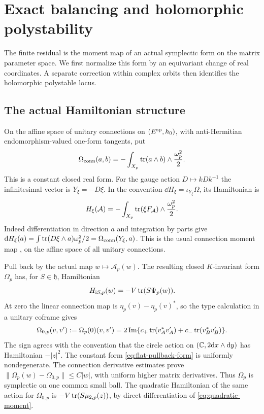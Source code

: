 \section{Exact balancing and holomorphic polystability}
\label{sec:balancing}

The finite residual is the moment map of an actual symplectic
form on the matrix parameter space. We first normalize this form
by an equivariant change of real coordinates. A separate
correction within complex orbits then identifies the holomorphic
polystable locus.

\subsection{The actual Hamiltonian structure}

On the affine space of unitary connections on $(E^{\rm sp},h_0)$,
with anti-Hermitian endomorphism-valued one-form tangents, put
\begin{equation}\label{eq:connection-symplectic}
 \Omega_{\rm conn}(a,b)
       =-\int_{X_p}\operatorname{tr}(a\wedge b)\wedge\frac{\omega_p^2}{2}.
\end{equation}
This is a constant closed real form. For the gauge action
$D\mapsto kDk^{-1}$ the infinitesimal vector is
$Y_\xi=-D\xi$. In the convention $\dd H_\xi=\iota_{Y_\xi}\Omega$,
its Hamiltonian is
\[
 H_\xi(\mathcal A)
       =-\int_{X_p}\operatorname{tr}(\xi F_{\mathcal A})\wedge\frac{\omega_p^2}{2}.
\]
Indeed differentiation in direction $a$ and integration by
parts give
$\mathrm d H_\xi(a)=\int\operatorname{tr}(D\xi\wedge a)\omega_p^2/2
=\Omega_{\rm conn}(Y_\xi,a)$.
This is the usual connection moment map
\cite[Section 1.1 and Lemma 1.5]{ACG}, on the affine space
of all unitary connections.

Pull back by the actual map $w\mapsto\mathcal A_p(w)$.
The resulting closed $K$-invariant form $\Omega_p$ has,
for $S\in\mathfrak h$, Hamiltonian
\begin{equation}\label{eq:actual-paired-hamiltonian}
       H_{\mathrm iS,p}(w)=-V\operatorname{tr}(S\Psi_p(w)).
\end{equation}
At zero the linear connection map is
$\eta_p(v)-\eta_p(v)^*$, so the type calculation in a
unitary coframe gives
\begin{equation}\label{eq:flat-pullback-form}
 \Omega_{0,p}(v,v'):=\Omega_p(0)(v,v')
 =2\operatorname{Im}\{c_+\operatorname{tr}(v_A^*v_A')+c_-\operatorname{tr}(v_B^*v_B')\}.
\end{equation}
The sign agrees with the convention that the circle action
on $(\mathbb C,2\mathrm d x\wedge\mathrm d y)$ has Hamiltonian $-|z|^2$.
The constant form \eqref{eq:flat-pullback-form} is uniformly
nondegenerate. The connection derivative estimates prove
$\|\Omega_p(w)-\Omega_{0,p}\|\le C|w|$, with uniform
higher matrix derivatives. Thus $\Omega_p$ is symplectic
on one common small ball. The quadratic Hamiltonian of
the same action for $\Omega_{0,p}$ is
$-V\operatorname{tr}(S\mu_{2,p}(z))$, by direct differentiation of
\eqref{eq:quadratic-moment}.

